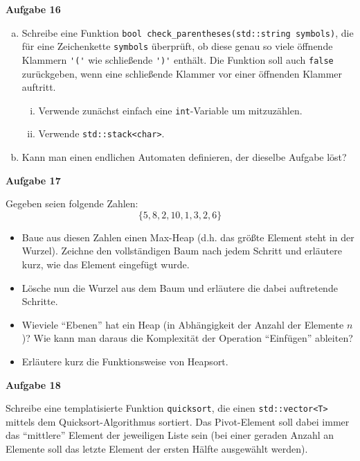 \documentclass[a4paper,12pt,parskip=full]{scrartcl}
\newcommand{\Aufgabe}[1]{
  {
    \vspace*{0.5cm}
    \textsf{\textbf{Aufgabe #1}}
    \vspace*{0.2cm}
    
  }
}
\begin{document}
\Aufgabe{16}
\begin{enumerate}[a)]
\item Schreibe eine Funktion \lstinline{bool check_parentheses(std::string symbols)}, die für eine Zeichenkette
  \lstinline{symbols} überprüft, ob diese genau so viele öffnende
  Klammern \lstinline{'('} wie schließende \lstinline{')'}
  enthält. Die Funktion soll auch \lstinline{false} zurückgeben, wenn
  eine schließende Klammer vor einer öffnenden Klammer auftritt.
  \begin{enumerate}[i)]
  \item Verwende zunächst einfach eine \lstinline{int}-Variable um
    mitzuzählen.
  \item Verwende \lstinline{std::stack<char>}.
  \end{enumerate}
\item Kann man einen endlichen Automaten definieren, der dieselbe
  Aufgabe löst?
\end{enumerate}

\Aufgabe{17} Gegeben seien folgende Zahlen:
$$ \{ 5, 8, 2, 10, 1, 3, 2, 6 \} $$
\begin{itemize}
\item Baue aus diesen Zahlen einen Max-Heap (d.h. das größte Element
  steht in der Wurzel). Zeichne den vollständigen Baum nach jedem
  Schritt und erläutere kurz, wie das Element eingefügt wurde.
\item Lösche nun die Wurzel aus dem Baum und erläutere die dabei
  auftretende Schritte.
\item Wieviele ``Ebenen'' hat ein Heap (in Abhängigkeit der Anzahl der
  Elemente $n$)? Wie kann man daraus die Komplexität der Operation
  ``Einfügen'' ableiten?
\item Erläutere kurz die Funktionsweise von Heapsort.
\end{itemize}

\Aufgabe{18} Schreibe eine templatisierte Funktion \texttt{quicksort},
die einen \lstinline{std::vector<T>} mittels dem Quicksort-Algorithmus
sortiert. Das Pivot-Element soll dabei immer das ``mittlere'' Element
der jeweiligen Liste sein (bei einer geraden Anzahl an Elemente soll
das letzte Element der ersten Hälfte ausgewählt werden).
\end{document}
